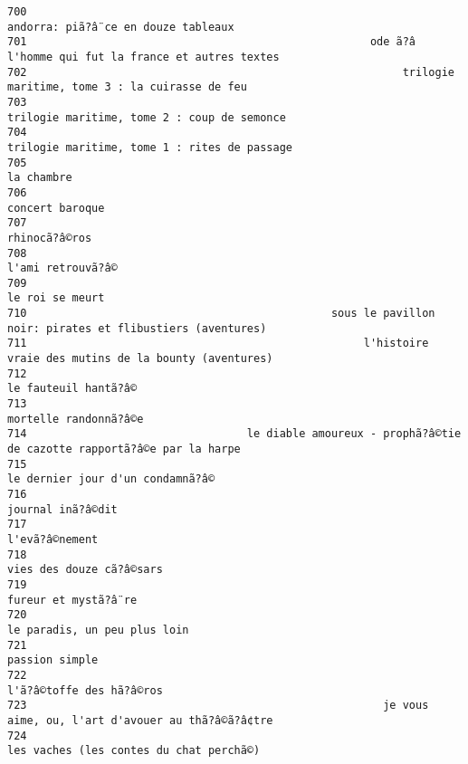\documentclass[
]{report}
\begin{document}
\begin{verbatim}
700                                                                     andorra: piã?â¨ce en douze tableaux
701                                                     ode ã?â  l'homme qui fut la france et autres textes
702                                                          trilogie maritime, tome 3 : la cuirasse de feu
703                                                             trilogie maritime, tome 2 : coup de semonce
704                                                            trilogie maritime, tome 1 : rites de passage
705                                                                                              la chambre
706                                                                                         concert baroque
707                                                                                           rhinocã?â©ros
708                                                                                       l'ami retrouvã?â©
709                                                                                         le roi se meurt
710                                               sous le pavillon noir: pirates et flibustiers (aventures)
711                                                    l'histoire vraie des mutins de la bounty (aventures)
712                                                                                    le fauteuil hantã?â©
713                                                                                   mortelle randonnã?â©e
714                                  le diable amoureux - prophã?â©tie de cazotte rapportã?â©e par la harpe
715                                                                        le dernier jour d'un condamnã?â©
716                                                                                       journal inã?â©dit
717                                                                                          l'evã?â©nement
718                                                                                vies des douze cã?â©sars
719                                                                                    fureur et mystã?â¨re
720                                                                            le paradis, un peu plus loin
721                                                                                          passion simple
722                                                                                l'ã?â©toffe des hã?â©ros
723                                                       je vous aime, ou, l'art d'avouer au thã?â©ã?â¢tre
724                                                                 les vaches (les contes du chat perchã©)

\end{verbatim}
\end{document}
